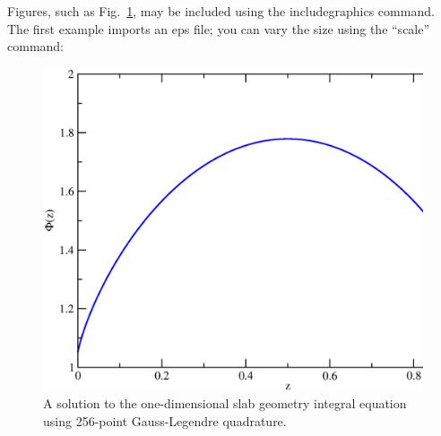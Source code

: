 \documentclass{ictt25}
\begin{document}
Figures, such as Fig.~\ref{fig:example-figure}, may be included using
the includegraphics command. The first example imports an eps file; you can vary
the size using the ``scale'' command:
%
\begin{figure}[!htb]
\begin{center}
\includegraphics[scale=0.3,clip=true]{./figure.eps} 
\begin{spacing}{1.0}
\caption{A solution to the one-dimensional slab geometry integral 
equation using 256-point Gauss-Legendre quadrature.%
\label{fig:example-figure}}
\end{spacing}
\end{center}
\end{figure}
\end{document}
